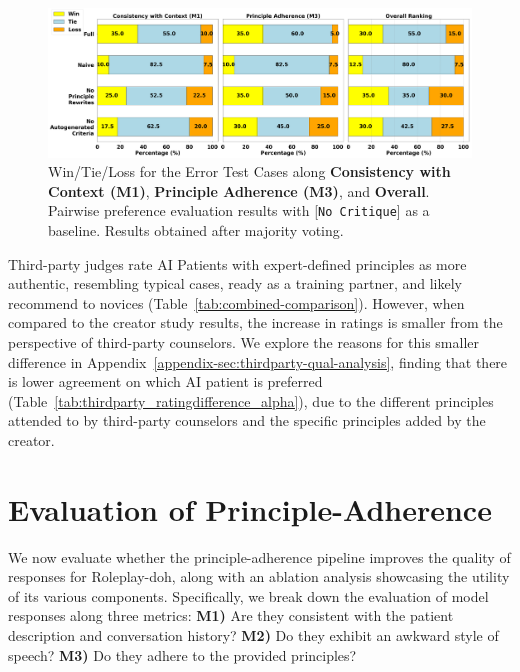 \documentclass[11pt]{article}
\begin{document}
\begin{figure}
    \centering
    \includegraphics[width=\textwidth]{figures/error_2.png}\vspace{-0.05in}
    \caption{\small{Win/Tie/Loss for the Error Test Cases along \textbf{Consistency with Context (M1)}, \textbf{Principle Adherence (M3)}, and \textbf{Overall}. Pairwise preference evaluation results with [\texttt{No Critique}] as a baseline. Results obtained after majority voting.}}
    \label{fig:wtl-error}
\end{figure}

Third-party judges rate AI Patients with expert-defined principles as more authentic, resembling typical cases, ready as a training partner, and likely recommend to novices (Table~\ref{tab:combined-comparison}). 
However, when compared to the creator study results, the increase in ratings is smaller from the perspective of third-party counselors.
We explore the reasons for this smaller difference in Appendix~\ref{appendix-sec:thirdparty-qual-analysis}, finding that there is lower agreement on which AI patient is preferred (Table~\ref{tab:thirdparty_ratingdifference_alpha}), due to the different principles attended to by third-party counselors and the specific principles added by the creator.
\vspace{-0.05in}
\section{Evaluation of Principle-Adherence}
\label{sec:evalpap}
\vspace{-0.05in}
We now evaluate whether the principle-adherence pipeline improves the quality of responses for Roleplay-doh, along with an ablation analysis showcasing the utility of its various components. Specifically, we break down the evaluation of model responses along three metrics: \textbf{M1)} Are they consistent with the patient description and conversation history? \textbf{M2)} Do they exhibit an awkward style of speech? \textbf{M3)} Do they adhere to the provided principles?
\end{document}
